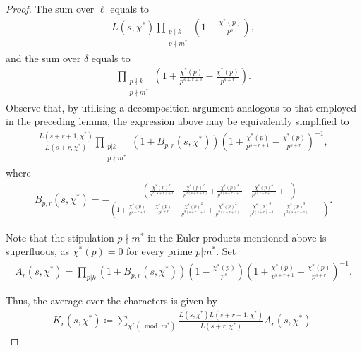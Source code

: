 \documentclass[12pt, oneside,reqno]{amsart}
\numberwithin{equation}{section}
\begin{document}
\begin{proof}
\noindent
The sum over $\ell$ equals to
\begin{align}\label{sumoverl}
L(s,\chi^{*})\prod_{\substack{p\mid k\\p\nmid m^*}}\left(1-\frac{\chi^*(p)}{p^s}\right), 
\end{align}
and the sum over $\delta$ equals to
\begin{align}\label{sumoverdelta}
\prod_{\substack{p\nmid k\\p\nmid m^{*}}}\left(1+\frac{\chi^{*}(p)}{p^{s+r+1}}-\frac{\chi^*(p)}{p^{s+r}}\right).  
\end{align}
\noindent
Observe that, by utilising a decomposition argument analogous to that employed in the preceding lemma, the expression above may be equivalently simplified to
\begin{align*}
\frac{L(s+r+1,\chi^{*})}{L(s+r,\chi^{*})}\prod_{\substack{p|k\\p\nmid m^{*}}}(1+B_{p,r}(s,\chi^*))\left(1+\frac{\chi^{*}(p)}{p^{s+r+1}}-\frac{\chi^*(p)}{p^{s+r}}\right)^{-1},
\end{align*}
where 
\begin{align}\label{bprschidefinition}
B_{p,r}(s,\chi^*)
=-\frac{\left(\frac{{\chi^{*}}(p)^2}{p^{2(s+r)+1}}-\frac{{\chi^{*}}(p)^2}{p^{2(s+r+1)}}+\frac{{\chi^{*}}(p)^3}{p^{3(s+r)+1}}-\frac{{\chi^{*}}(p)^3}{p^{3(s+r+1)}}+\cdots\right)}{\left(1+\frac{\chi^{*}(p)}{p^{s+r+1}}-\frac{\chi^*(p)}{p^{s+r}}-\frac{{\chi^{*}}(p)^2}{p^{2(s+r)+1}}+\frac{{\chi^{*}}(p)^2}{p^{2(s+r+1)}}-\frac{{\chi^{*}}(p)^3}{p^{3(s+r)+1}}+\frac{{\chi^{*}}(p)^3}{p^{3(s+r+1)}}-\cdots\right)}.
\end{align}

\noindent
Note that the stipulation $p\nmid m^*$ in the Euler products mentioned above is superfluous, as $\chi^*(p)=0$ for every prime $p|m^*$. Set
\begin{align}\label{arschidefinition}
A_r(s,\chi^*)
=\prod_{p|k}(1+B_{p,r}(s,\chi^*))\left(1-\frac{\chi^*(p)}{p^s}\right)\left(1+\frac{\chi^{*}(p)}{p^{s+r+1}}-\frac{\chi^*(p)}{p^{s+r}}\right)^{-1}.
\end{align}

\noindent
Thus, the average over the characters is given by
\begin{align}\label{krschidefinition}
K_r(s,\chi^*)
\coloneqq\sum_{\chi^*(\bmod{m^*})}\frac{L(s,\chi^*)L(s+r+1,\chi^*)}{L(s+r,\chi^{*})}A_r(s,\chi^*).
\end{align}


\end{proof}
\end{document}
